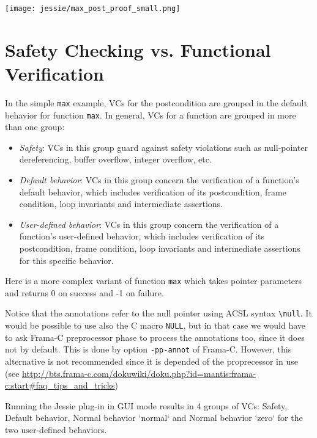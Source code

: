 \documentclass[a4paper,11pt,twoside,openright]{report}
\begin{document}
\begin{center}
  \texttt{[image: jessie/max\_post\_proof\_small.png]}
\end{center}

\section{Safety Checking vs. Functional Verification}

In the simple \verb|max| example, VCs for the postcondition are grouped
in the default behavior for function \verb|max|. In general, VCs for a
function are grouped in more than one group:

\begin{itemize}
\item \textit{Safety}: VCs in this group guard against safety violations
  such as null-pointer dereferencing, buffer overflow, integer overflow, etc.
\item \textit{Default behavior}: VCs in this group concern the
  verification of a function's default behavior, which includes
  verification of its postcondition, frame condition, loop invariants
  and intermediate assertions.
\item \textit{User-defined behavior}: VCs in this group concern the
  verification of a function's user-defined behavior, which includes
  verification of its postcondition, frame condition, loop invariants
  and intermediate assertions for this specific behavior.
\end{itemize}

Here is a more complex variant of function \verb|max| which takes
pointer parameters and returns 0 on success and -1 on failure.



Notice that the annotations refer to the null pointer using ACSL
syntax \verb|\null|. It would be possible to use also the C macro
\texttt{NULL}, but in that case we would have to ask Frama-C
preprocessor phase to process the annotations too, since it does not
by default. This is done by option \verb|-pp-annot| of
Frama-C. However, this alternative is not recommended since it is
depended of the proprecessor in use (see \url{http://bts.frama-c.com/dokuwiki/doku.php?id=mantis:frama-c:start#faq_tips_and_tricks})

Running the Jessie plug-in in GUI mode results in 4 groups of VCs:
Safety, Default behavior, Normal behavior `normal` and Normal behavior
`zero` for the two user-defined behaviors.
\end{document}

